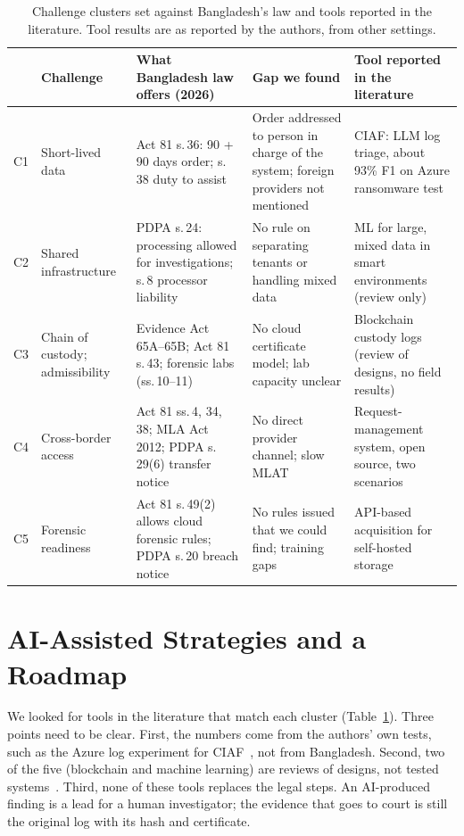 \documentclass[conference]{IEEEtran}
\begin{document}
\begin{table}[t]
\centering
\caption{Challenge clusters set against Bangladesh's law and tools reported in the literature. Tool results are as reported by the authors, from other settings.}
\label{tab:matrix}
\small
\renewcommand{\arraystretch}{1.1}
\begin{tabularx}{\textwidth}{@{}l >{\raggedright\arraybackslash}p{2.6cm} >{\raggedright\arraybackslash}X >{\raggedright\arraybackslash}X >{\raggedright\arraybackslash}X@{}}
\toprule
 & Challenge & What Bangladesh law offers (2026) & Gap we found & Tool reported in the literature \\
\midrule
C1 & Short-lived data & Act 81 s.\,36: 90 + 90 days order; s.\,38 duty to assist & Order addressed to person in charge of the system; foreign providers not mentioned & CIAF: LLM log triage, about 93\% F1 on Azure ransomware test~\cite{ciaf} \\
C2 & Shared infrastructure & PDPA s.\,24: processing allowed for investigations; s.\,8 processor liability & No rule on separating tenants or handling mixed data & ML for large, mixed data in smart environments (review only)~\cite{tageldin} \\
C3 & Chain of custody; admissibility & Evidence Act 65A--65B; Act 81 s.\,43; forensic labs (ss.\,10--11) & No cloud certificate model; lab capacity unclear & Blockchain custody logs (review of designs, no field results)~\cite{igonor} \\
C4 & Cross-border access & Act 81 ss.\,4, 34, 38; MLA Act 2012; PDPA s.\,29(6) transfer notice & No direct provider channel; slow MLAT~\cite{akilal} & Request-management system, open source, two scenarios~\cite{akilal} \\
C5 & Forensic readiness & Act 81 s.\,49(2) allows cloud forensic rules; PDPA s.\,20 breach notice & No rules issued that we could find; training gaps~\cite{sharmin} & API-based acquisition for self-hosted storage~\cite{kulper} \\
\bottomrule
\end{tabularx}
\end{table}

\section{AI-Assisted Strategies and a Roadmap}
We looked for tools in the literature that match each cluster (Table~\ref{tab:matrix}). Three points need to be clear. First, the numbers come from the authors' own tests, such as the Azure log experiment for CIAF~\cite{ciaf}, not from Bangladesh. Second, two of the five (blockchain and machine learning) are reviews of designs, not tested systems~\cite{igonor,tageldin}. Third, none of these tools replaces the legal steps. An AI-produced finding is a lead for a human investigator; the evidence that goes to court is still the original log with its hash and certificate.
\end{document}

